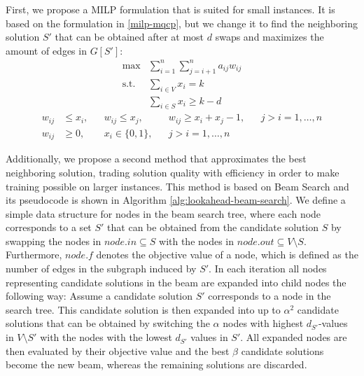 \documentclass[draft,final]{vutinfth} %
\begin{document}
First, we propose a MILP formulation that is suited for small instances. 
It is based on the formulation in \ref{milp-mqcp}, but we change it to find the neighboring solution $S'$ that can be obtained after at most $d$ swaps and maximizes the amount of edges in $G[S']$: 
\begin{align}
    \max & \sum_{i=1}^n \sum_{j=i+1}^n a_{ij} w_{ij} \\
    \text{s.t. } & \sum_{i \in V} x_i = k \\
     & \sum_{i \in S} x_i \geq k - d    
\end{align}
\begin{align}
    w_{ij} &\leq x_i, & & w_{ij} \leq x_j, & & w_{ij} \geq x_i + x_j - 1, & & j > i=1, \dots , n \\
    w_{ij} &\geq 0,   & & x_i \in \{0,1\}, & & j > i = 1, \dots, n        & & 
\end{align}

Additionally, we propose a second method that approximates the best neighboring solution, trading solution quality with efficiency in order to make training possible on larger instances. This method is based on Beam Search and its pseudocode is shown in Algorithm \ref{alg:lookahead-beam-search}. We define a simple data structure for nodes in the beam search tree, where each node corresponds to a set $S'$ that can be obtained from the candidate solution $S$ by swapping the nodes in $node.in \subseteq S$ with the nodes in $node.out \subseteq V\setminus S$. Furthermore, $node.f$ denotes the objective value of a node, which is defined as the number of edges in the subgraph induced by $S'$. 
In each iteration all nodes representing candidate solutions in the beam are expanded into child nodes the following way: Assume a candidate solution $S'$ corresponds to a node in the search tree. This candidate solution is then expanded into up to $\alpha^2$ candidate solutions that can be obtained by switching the $\alpha$ nodes with highest $d_{S'}$-values in $V \setminus S'$ with the nodes with the lowest $d_{S'}$ values in $S'$. All expanded nodes are then evaluated by their objective value and the best $\beta$ candidate solutions become the new beam, whereas the remaining solutions are discarded.
\end{document}
